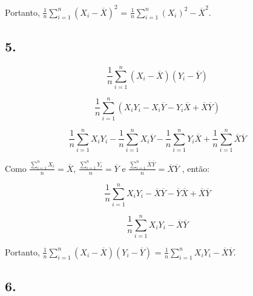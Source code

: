 \documentclass[hidelinks,11pt]{book}
\theoremstyle{definition}
\begin{document}
Portanto, $\frac{1}{n} \sum_{i = 1}^{n} (X_i - \overline{X})^2$ = $\frac{1}{n} \sum_{i = 1}^{n} ({X_i})^2 -   \overline{X}^2$.



	\subsection*{5.}
	
\begin{displaymath}
	\frac{1}{n} \sum_{i = 1}^{n} (X_i - \overline{X}) (Y_i - \overline{Y})
\end{displaymath}

\begin{displaymath}
	\frac{1}{n} \sum_{i = 1}^{n} (X_iY_i -X_i\overline{Y} - Y_i\overline{X} + \overline{X}\overline{Y})
\end{displaymath}

\begin{displaymath}
	\frac{1}{n} \sum_{i = 1}^{n} X_iY_i - \frac{1}{n} \sum_{i = 1}^{n}X_i\overline{Y} - \frac{1}{n} \sum_{i = 1}^{n}Y_i\overline{X} + \frac{1}{n} \sum_{i = 1}^{n}\overline{X}\overline{Y}
\end{displaymath}

\vspace{2em}

Como $\frac{\sum_{i = 1}^{n} X_i}{n}=\overline{X}$, $\frac{\sum_{i = 1}^{n} Y_i}{n}=\overline{Y}$ e $\frac{\sum_{i = 1}^{n}\overline{X}\overline{Y}}{n}=\overline{X}\overline{Y}$ , então:

\vspace{2em}

\begin{displaymath}
	\frac{1}{n} \sum_{i = 1}^{n} X_iY_i - \overline{X}\overline{Y} - \overline{Y}\overline{X} + \overline{X}\overline{Y}
\end{displaymath}


\begin{displaymath}
	\frac{1}{n} \sum_{i = 1}^{n} X_iY_i - \overline{X}\overline{Y}
\end{displaymath}

\vspace{2em}

Portanto, $\frac{1}{n} \sum_{i = 1}^{n} (X_i - \overline{X}) (Y_i - \overline{Y})$ = $\frac{1}{n} \sum_{i = 1}^{n} X_iY_i - \overline{X}\overline{Y}$.

	\subsection*{6.}
\end{document}
